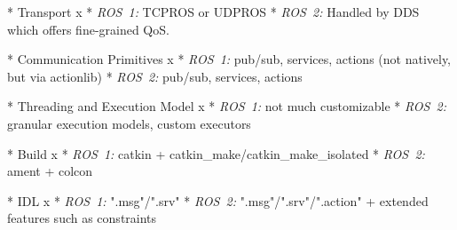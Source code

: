 * Transport
\begitems \style x
* {\em ROS~1:} TCPROS or UDPROS
* {\em ROS~2:} Handled by DDS which offers fine-grained QoS.
\enditems

* Communication Primitives
\begitems \style x
* {\em ROS~1:} pub/sub, services, actions (not natively, but via actionlib)
* {\em ROS~2:} pub/sub, services, actions
\enditems

* Threading and Execution Model
\begitems \style x
* {\em ROS~1:} not much customizable
* {\em ROS~2:} granular execution models, custom executors
\enditems

* Build
\begitems \style x
* {\em ROS~1:} catkin + catkin_make/catkin_make_isolated
* {\em ROS~2:} ament + colcon
\enditems

* IDL
\begitems \style x
* {\em ROS~1:} ".msg"/".srv"
* {\em ROS~2:} ".msg"/".srv"/".action" + extended features such as constraints
\enditems

\enditems
